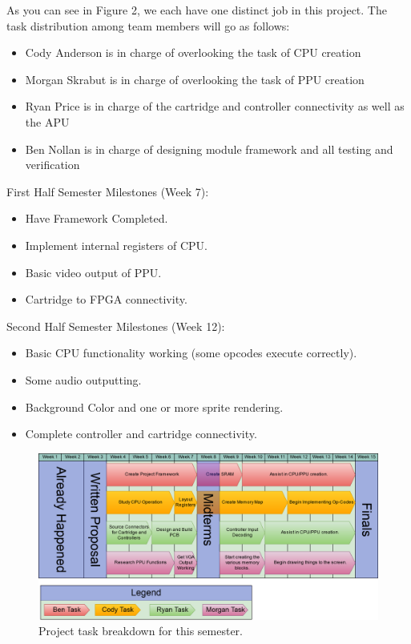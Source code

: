\documentclass[a4paper]{article}
\begin{document}
As you can see in Figure 2, we each have one distinct job in this project. The task distribution among team members will go as follows:
\begin{itemize}
\item Cody Anderson is in charge of overlooking the task of CPU creation \\
\item Morgan Skrabut is in charge of overlooking the task of PPU creation \\
\item Ryan Price is in charge of the cartridge and controller connectivity as well as the APU \\
\item Ben Nollan is in charge of designing module framework and all testing and verification
\end{itemize}
First Half Semester Milestones (Week 7):
\begin{itemize}
\item Have Framework Completed. \\
\item Implement internal registers of CPU. \\
\item Basic video output of PPU. \\
\item Cartridge to FPGA connectivity. \\
\end{itemize}
Second Half Semester Milestones (Week 12):
\begin{itemize}
\item Basic CPU functionality working (some opcodes execute correctly). \\
\item Some audio outputting. \\
\item Background Color and one or more sprite rendering. \\
\item Complete controller and cartridge connectivity. \\
\end{itemize}
\begin{figure}[H]
\centering
\includegraphics[width=\textwidth]{Schedule.png}
\caption{\label{fig:Schedule}Project task breakdown for this semester.}
\end{figure}
\end{document}
